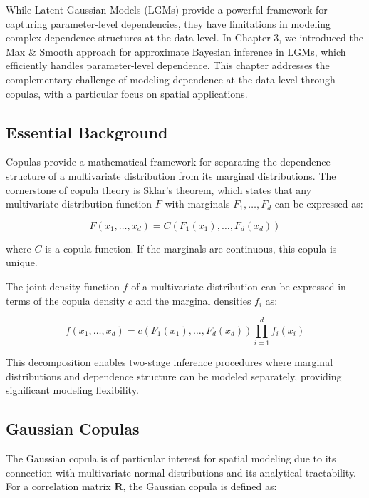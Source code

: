 

While Latent Gaussian Models (LGMs) provide a powerful framework for capturing parameter-level dependencies, they have limitations in modeling complex dependence structures at the data level. In Chapter 3, we introduced the Max \& Smooth approach for approximate Bayesian inference in LGMs, which efficiently handles parameter-level dependence. This chapter addresses the complementary challenge of modeling dependence at the data level through copulas, with a particular focus on spatial applications.

\subsection{Essential Background}

Copulas provide a mathematical framework for separating the dependence structure of a multivariate distribution from its marginal distributions. The cornerstone of copula theory is Sklar's theorem, which states that any multivariate distribution function $F$ with marginals $F_1,\ldots,F_d$ can be expressed as:

\begin{equation}
F(x_1,\ldots,x_d) = C(F_1(x_1),\ldots,F_d(x_d))
\end{equation}

where $C$ is a copula function. If the marginals are continuous, this copula is unique.

The joint density function $f$ of a multivariate distribution can be expressed in terms of the copula density $c$ and the marginal densities $f_i$ as:

\begin{equation}
f(x_1,\ldots,x_d) = c(F_1(x_1),\ldots,F_d(x_d)) \prod_{i=1}^d f_i(x_i)
\end{equation}

This decomposition enables two-stage inference procedures where marginal distributions and dependence structure can be modeled separately, providing significant modeling flexibility.

\subsection{Gaussian Copulas}
The Gaussian copula is of particular interest for spatial modeling due to its connection with multivariate normal distributions and its analytical tractability. For a correlation matrix $\mathbf{R}$, the Gaussian copula is defined as:

